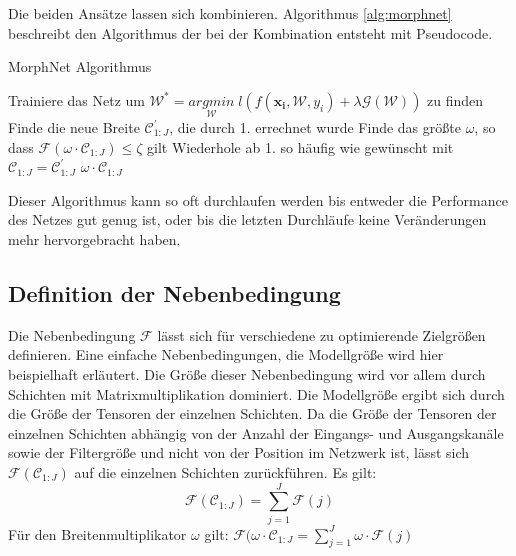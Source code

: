 Die beiden Ansätze lassen sich kombinieren. Algorithmus \ref{alg:morphnet} beschreibt den Algorithmus der bei der Kombination entsteht mit Pseudocode.
\begin{algorithm}[H]
\caption{MorphNet Algorithmus}
\begin{algorithmic}[1]
\STATE Trainiere das Netz um $\mathcal{W}^{\ast}=\underset{\mathcal{W}}{arg min}\; l(f(\mathbf{x_i}, \mathcal{W},y_i) + \lambda \mathcal{G}(\mathcal{W}))$ zu finden
\STATE Finde die neue Breite $\mathcal{C}_{1:J}^{\prime}$, die durch 1. errechnet wurde
\STATE Finde das größte $\omega$, so dass $\mathcal{F}(\omega \cdot \mathcal{C}_{1:J})\leq \zeta$ gilt
\STATE Wiederhole ab 1. so häufig wie gewünscht mit $\mathcal{C}_{1:J} = \mathcal{C}_{1:J}^{\prime}$
\ENSURE $\omega \cdot \mathcal{C}_{1:J}$
\end{algorithmic}
\label{alg:morphnet}
\end{algorithm}
Dieser Algorithmus kann so oft durchlaufen werden bis entweder die Performance des Netzes gut genug ist, oder bis die letzten Durchläufe keine Veränderungen mehr hervorgebracht haben.


\subsection{Definition der Nebenbedingung}
Die Nebenbedingung $\mathcal{F}$ lässt sich für verschiedene zu optimierende Zielgrößen definieren. Eine einfache Nebenbedingungen, die Modellgröße wird hier beispielhaft erläutert. Die Größe dieser Nebenbedingung wird vor allem durch Schichten mit Matrixmultiplikation dominiert. Die Modellgröße ergibt sich durch die Größe der Tensoren der einzelnen Schichten. Da die Größe der Tensoren der einzelnen Schichten abhängig von der Anzahl der Eingangs- und Ausgangskanäle sowie der Filtergröße und nicht von der Position im Netzwerk ist, lässt sich $\mathcal{F}(\mathcal{C}_{1:J})$ auf die einzelnen Schichten zurückführen. Es gilt:
\begin{equation}
 \mathcal{F}(\mathcal{C}_{1:J})=\sum_{j=1}^{J} \mathcal{F}(j)
\end{equation}
Für den Breitenmultiplikator $\omega$ gilt: $\mathcal{F}(\omega \cdot \mathcal{C}_{1:J}=\sum_{j=1}^{J} \omega \cdot \mathcal{F}(j)$

